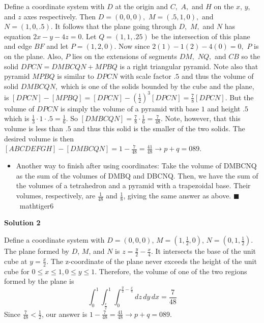 \begin{enumerate}
Define a coordinate system with $D$ at the origin and $C,$ $A,$ and $H$ on the $x$, $y$, and $z$ axes respectively. Then $D=(0,0,0),$ $M=(.5,1,0),$ and $N=(1,0,.5).$ It follows that the plane going through $D,$ $M,$ and $N$ has equation $2x-y-4z=0.$ Let $Q = (1,1,.25)$ be the intersection of this plane and edge $BF$ and let $P = (1,2,0).$ Now since $2(1) - 1(2) - 4(0) = 0,$ $P$ is on the plane. Also, $P$ lies on the extensions of segments $DM,$ $NQ,$ and $CB$ so the solid $DPCN = DMBCQN + MPBQ$ is a right triangular pyramid. Note also that pyramid $MPBQ$ is similar to $DPCN$ with scale factor $.5$ and thus the volume of solid $DMBCQN,$ which is one of the solids bounded by the cube and the plane, is $[DPCN] - [MPBQ] = [DPCN] - \left(\frac{1}{2}\right)^3[DPCN] = \frac{7}{8}[DPCN].$ But the volume of $DPCN$ is simply the volume of a pyramid with base $1$ and height $.5$ which is $\frac{1}{3} \cdot 1 \cdot .5 = \frac{1}{6}.$ So $[DMBCQN] = \frac{7}{8} \cdot \frac{1}{6} = \frac{7}{48}.$ Note, however, that this volume is less than $.5$ and thus this solid is the smaller of the two solids. The desired volume is then $[ABCDEFGH] - [DMBCQN] = 1 - \frac{7}{48} = \frac{41}{48} \rightarrow p+q = \boxed{089.}$

            \begin{itemize}
        \item Another way to finish after using coordinates: Take the volume of DMBCNQ as the sum of the volumes of DMBQ and DBCNQ. Then, we have the sum of the volumes of a tetrahedron and a pyramid with a trapezoidal base. Their volumes, respectively, are $\frac{1}{48}$ and $\frac{1}{8}$, giving the same answer as above. $\blacksquare$ ~mathtiger6
            \end{itemize}
            



\textbf{Solution 2}

Define a coordinate system with $D = (0,0,0)$, $M = (1, \frac{1}{2}, 0)$, $N = (0,1,\frac{1}{2})$. The plane formed by $D$, $M$, and $N$ is $z = \frac{y}{2} - \frac{x}{4}$. It intersects the base of the unit cube at $y = \frac{x}{2}$. The z-coordinate of the plane never exceeds the height of the unit cube for $0 \leq x \leq 1, 0 \leq y \leq 1$. Therefore, the volume of one of the two regions formed by the plane is
 \[\int_0^1 \int_{\frac{x}{2}}^1 \int_0^{\frac{y}{2}-\frac{x}{4}}dz\,dy\,dx = \frac{7}{48}\]Since $\frac{7}{48} < \frac{1}{2}$, our answer is $1-\frac{7}{48} = \frac{41}{48} \rightarrow p+q = \boxed{089}$.


\end{enumerate}
